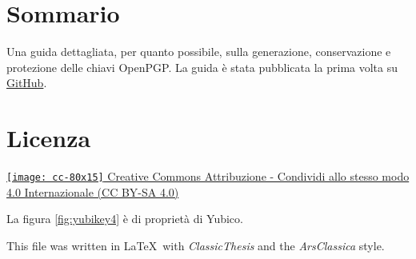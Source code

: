 \begingroup
	\footnotesize

	\section*{Sommario}
	Una guida dettagliata, per quanto possibile, sulla generazione,
	conservazione e protezione delle chiavi OpenPGP. La guida è stata pubblicata
	la prima volta su
	\href{https://github.com/aldolat/generazione-sicura-chiavi-openpgp}{GitHub}.

	\section*{Licenza}
	\href{https://creativecommons.org/licenses/by-sa/4.0/deed.it}{\texttt{[image: cc-80x15]}
	Creative Commons Attribuzione - Condividi allo stesso modo 4.0 Internazionale
	(CC BY-SA 4.0)} \bigskip

	\noindent La figura \vref{fig:yubikey4} è di proprietà di Yubico.

	\vfill

	\noindent This file was written in \LaTeX~with \textit{ClassicThesis} and
	the \textit{ArsClassica} style.

\endgroup